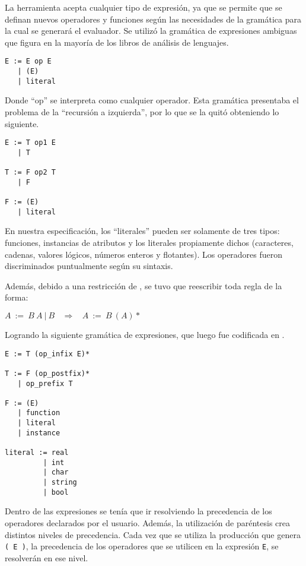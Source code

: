 La herramienta acepta cualquier tipo de expresión, ya que se permite que se definan nuevos operadores y funciones según las necesidades de la gramática para la cual se generará el evaluador. Se utilizó la gramática de expresiones ambiguas que figura en la mayoría de los libros de análisis de lenguajes.

\begin{lstlisting}[backgroundcolor=\color{white}]
E := E op E
   | (E)
   | literal
\end{lstlisting}

Donde ``op'' se interpreta como cualquier operador. Esta gramática presentaba el problema de la ``recursión a izquierda'', por lo que se la quitó obteniendo lo siguiente.

\begin{lstlisting}[backgroundcolor=\color{white}]
E := T op1 E
   | T

T := F op2 T
   | F

F := (E)
   | literal
\end{lstlisting}

En nuestra especificación, los ``literales'' pueden ser solamente de tres tipos: funciones, instancias de atributos y los literales propiamente dichos (caracteres, cadenas, valores lógicos, números enteros y flotantes). Los operadores fueron discriminados puntualmente según su sintaxis.

Además, debido a una restricción de \spirit, se tuvo que reescribir toda regla de la forma:

\begin{center}\textbf{\large{$A\ :=\ B\ A\ |\ B\ \ \ \ \Rightarrow\ \ \ \ A\ :=\ B\ (A)*$}}\end{center}

Logrando la siguiente gramática de expresiones, que luego fue codificada en \spirit.

\begin{lstlisting}[backgroundcolor=\color{white}]
E := T (op_infix E)*

T := F (op_postfix)*
   | op_prefix T

F := (E)
   | function
   | literal
   | instance

literal := real
         | int
         | char
         | string
         | bool
\end{lstlisting}

Dentro de las expresiones se tenía que ir resolviendo la precedencia de los operadores declarados por el usuario. Además, la utilización de paréntesis crea distintos niveles de precedencia. Cada vez que se utiliza la producción que genera \texttt{( E )}, la precedencia de los operadores que se utilicen en la expresión \texttt{E}, se resolverán en ese nivel.

